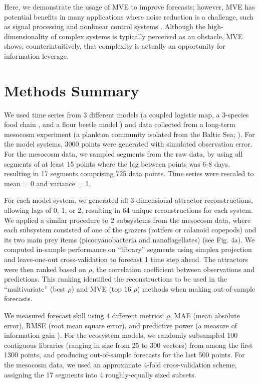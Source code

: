 Here, we demonstrate the usage of MVE to improve forecasts; however, MVE has potential benefits in many applications where noise reduction is a challenge, such as signal processing \cite{Carroll_2012} and nonlinear control systems \cite{Ott_1990}. Although the high-dimensionality of complex systems is typically perceived as an obstacle, MVE shows, counterintuitively, that complexity is actually an opportunity for information leverage.

\section{Methods Summary}

We used time series from 3 different models (a coupled logistic map, a 3-species food chain \cite{Hastings_1991}, and a flour beetle model \cite{Dennis_2001}) and data collected from a long-term mesocosm experiment (a plankton community isolated from the Baltic Sea; \cite{Heerkloss_1998, Beninca_2009}). For the model systems, 3000 points were generated with simulated observation error. For the mesocosm data, we sampled segments from the raw data, by using all segments of at least 15 points where the lag between points was 6-8 days, resulting in 17 segments comprising 725 data points. Time series were rescaled to mean = 0 and variance = 1.

For each model system, we generated all 3-dimensional attractor reconstructions, allowing lags of 0, 1, or 2, resulting in 64 unique reconstructions for each system. We applied a similar procedure to 2 subsystems from the mesocosm data, where each subsystem consisted of one of the grazers (rotifers or calanoid copepods) and its two main prey items (picocyanobacteria and nanoflagellates) (see Fig. 4a). We computed in-sample performance on ``library'' segments using simplex projection \cite{Sugihara_1990} and leave-one-out cross-validation to forecast 1 time step ahead. The attractors were then ranked based on $\rho$, the correlation coefficient between observations and predictions. This ranking identified the reconstructions to be used in the ``multivariate'' (best $\rho$) and MVE (top 16 $\rho$) methods when making out-of-sample forecasts.

We measured forecast skill using 4 different metrics: $\rho$, MAE (mean absolute error), RMSE (root mean square error), and predictive power (a measure of information gain \cite{Schneider_1999}). For the ecosystem models, we randomly subsampled 100 contiguous libraries (ranging in size from 25 to 300 vectors) from among the first 1300 points, and producing out-of-sample forecasts for the last 500 points. For the mesocosm data, we used an approximate 4-fold cross-validation scheme, assigning the 17 segments into 4 roughly-equally sized subsets.

